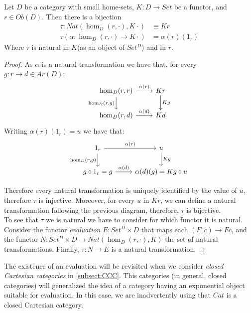 \begin{theorem}\cite[Section 3.2]{mac2013categories}
  Let $D$ be a category with small home-sets, $K:D\to Set$ be a functor, and $r\in Ob(D)$. Then there is a bijection
  \begin{align*}
    \tau:Nat(\hom_D(r,\cdot), K\cdot) &\equiv Kr\\
    \tau(\alpha:\hom_D(r,\cdot)\to K\cdot)& = \alpha(r)(1_r)
  \end{align*}
  Where $\tau$ is natural in $K$(as an object of $Set^{D}$) and in $r$.
\end{theorem}
\begin{proof}
  As $\alpha$ is a natural transformation we have that, for every $g:r\to d\in Ar(D)$: 
  \[
    \begin{tikzcd}
      \hom_D(r,r)\arrow[swap]{d}{\hom_D(r,g)}\arrow{r}{\alpha(r)} & Kr\arrow{d}{Kg}\\
      \hom_D(r,d)\arrow{r}{\alpha(d)} & Kd
    \end{tikzcd}
  \]
  Writing $\alpha(r)(1_r) = u$ we have that:
  \[
    \begin{tikzcd}
      1_r\arrow[swap]{d}{\hom_D(r,g)}\arrow{r}{\alpha(r)} & u\arrow{d}{Kg}\\
      g\circ 1_r = g\arrow{r}{\alpha(d)} & \alpha(d)(g)=Kg\circ u
    \end{tikzcd}
  \]

  Therefore every natural transformation is uniquely identified by the value of $u$, therefore $\tau$ is injective. Moreover, for every $u$ in $Kr$, we can define a natural transformation following the previous diagram, therefore, $\tau$ is bijective.\\

  To see that $\tau$ we is natural we have to consider for which functor it is natural. Consider the functor \emph{evaluation} $E: Set^D\times D$ that maps each $(F,c)\to Fc$, and the functor $N:Set^D\times D\to Nat(\hom_D(r,\cdot),K)$ the set of natural transformations. Finally, $\tau:N\to E$ is a natural transformation.
\end{proof}
\begin{remark}
  The existence of an evaluation will be revisited when we consider \emph{closed Cartesian categories} in  \ref{subsect:CCC}. This categories (in general, closed categories) will generalized the idea of a category having an exponential object suitable for evaluation. In this case, we are inadvertently using that $Cat$ is a closed Cartesian category.
\end{remark}

